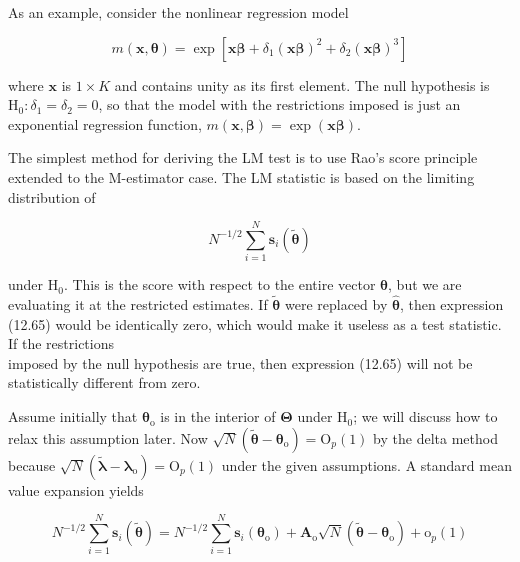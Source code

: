 \documentclass[10pt]{article}
\begin{document}
As an example, consider the nonlinear regression model

$$
m(\mathbf{x}, \boldsymbol{\theta})=\exp \left[\mathbf{x} \boldsymbol{\beta}+\delta_{1}(\mathbf{x} \boldsymbol{\beta})^{2}+\delta_{2}(\mathbf{x} \boldsymbol{\beta})^{3}\right]
$$

where $\mathbf{x}$ is $1 \times K$ and contains unity as its first element. The null hypothesis is $\mathrm{H}_{0}: \delta_{1}=\delta_{2}=0$, so that the model with the restrictions imposed is just an exponential regression function, $m(\mathbf{x}, \boldsymbol{\beta})=\exp (\mathbf{x} \boldsymbol{\beta})$.

The simplest method for deriving the LM test is to use Rao's score principle extended to the M-estimator case. The LM statistic is based on the limiting distribution of


\begin{equation*}
N^{-1 / 2} \sum_{i=1}^{N} \mathbf{s}_{i}(\tilde{\boldsymbol{\theta}}) \tag{12.65}
\end{equation*}


under $\mathrm{H}_{0}$. This is the score with respect to the entire vector $\boldsymbol{\theta}$, but we are evaluating it at the restricted estimates. If $\tilde{\boldsymbol{\theta}}$ were replaced by $\hat{\boldsymbol{\theta}}$, then expression (12.65) would be identically zero, which would make it useless as a test statistic. If the restrictions\\
imposed by the null hypothesis are true, then expression (12.65) will not be statistically different from zero.

Assume initially that $\boldsymbol{\theta}_{\mathrm{o}}$ is in the interior of $\boldsymbol{\Theta}$ under $\mathrm{H}_{0}$; we will discuss how to relax this assumption later. Now $\sqrt{N}\left(\tilde{\boldsymbol{\theta}}-\boldsymbol{\theta}_{\mathrm{o}}\right)=\mathrm{O}_{p}(1)$ by the delta method because $\sqrt{N}\left(\tilde{\boldsymbol{\lambda}}-\boldsymbol{\lambda}_{\mathrm{o}}\right)=\mathrm{O}_{p}(1)$ under the given assumptions. A standard mean value expansion yields


\begin{equation*}
N^{-1 / 2} \sum_{i=1}^{N} \mathbf{s}_{i}(\tilde{\boldsymbol{\theta}})=N^{-1 / 2} \sum_{i=1}^{N} \mathbf{s}_{i}\left(\boldsymbol{\theta}_{\mathrm{o}}\right)+\mathbf{A}_{\mathrm{o}} \sqrt{N}\left(\tilde{\boldsymbol{\theta}}-\boldsymbol{\theta}_{\mathrm{o}}\right)+\mathrm{o}_{p}(1) \tag{12.66}
\end{equation*}
\end{document}
